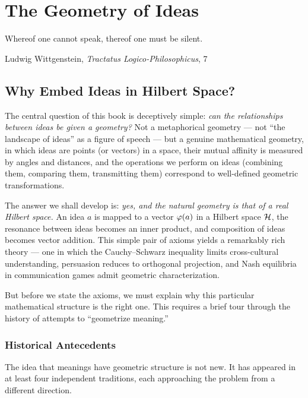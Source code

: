 \chapter{The Geometry of Ideas}
\label{ch:geometry}

\epigraph{Whereof one cannot speak, thereof one must be silent.}{Ludwig Wittgenstein, \textit{Tractatus Logico-Philosophicus}, 7}

\section{Why Embed Ideas in Hilbert Space?}

The central question of this book is deceptively simple: \emph{can the
relationships between ideas be given a geometry?} Not a metaphorical geometry
--- not ``the landscape of ideas'' as a figure of speech --- but a genuine
mathematical geometry, in which ideas are points (or vectors) in a space, their
mutual affinity is measured by angles and distances, and the operations we
perform on ideas (combining them, comparing them, transmitting them) correspond
to well-defined geometric transformations.

The answer we shall develop is: \emph{yes, and the natural geometry is that of
a real Hilbert space.} An idea $a$ is mapped to a vector $\varphi(a)$ in a
Hilbert space $\mathcal{H}$, the resonance between ideas becomes an inner product,
and composition of ideas becomes vector addition. This simple pair of axioms
yields a remarkably rich theory --- one in which the Cauchy--Schwarz inequality
limits cross-cultural understanding, persuasion reduces to orthogonal
projection, and Nash equilibria in communication games admit geometric
characterization.

But before we state the axioms, we must explain why this particular mathematical
structure is the right one. This requires a brief tour through the history of
attempts to ``geometrize meaning.''

\subsection{Historical Antecedents}

The idea that meanings have geometric structure is not new. It has appeared in
at least four independent traditions, each approaching the problem from a
different direction.

